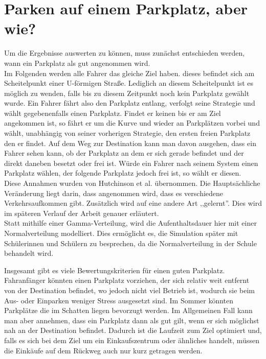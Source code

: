 \section{Parken auf einem Parkplatz, aber wie?}

Um die Ergebnisse auswerten zu können, muss zunächst entschieden werden, wann ein Parkplatz als gut angenommen wird.\\
Im Folgenden werden alle Fahrer das gleiche Ziel haben. dieses befindet sich am Scheitelpunkt einer U-förmigen Straße. Lediglich an diesem Scheitelpunkt ist es möglich zu wenden, falls bis zu diesem Zeitpunkt noch kein Parkplatz gewählt wurde. Ein Fahrer fährt also den Parkplatz entlang, verfolgt seine Strategie und wählt gegebenenfalls einen Parkplatz. Findet er keinen bis er am Ziel angekommen ist, so fährt er um die Kurve und wieder an Parkplätzen vorbei und wählt, unabhängig von seiner vorherigen Strategie, den ersten freien Parkplatz den er findet. Auf dem Weg zur Destination kann man davon ausgehen, dass ein Fahrer sehen kann, ob der Parkplatz an dem er sich gerade befindet und der direkt daneben besetzt oder frei ist. Würde ein Fahrer nach seinem System einen Parkplatz wählen, der folgende Parkplatz jedoch frei ist, so wählt er diesen.\\
Diese Annahmen wurden von Hutchinson et al. übernommen. Die Hauptsächliche Veränderung liegt darin, dass angenommen wird, dass es verschiedene Verkehrsaufkommen gibt. Zusätzlich wird auf eine andere Art ,,gelernt''. Dies wird im späteren Verlauf der Arbeit genauer erläutert.\\
Statt mithilfe einer Gamma-Verteilung, wird die Aufenthaltsdauer hier mit einer Normalverteilung modelliert. Dies ermöglicht es, die Simulation später mit Schülerinnen und Schülern zu besprechen, da die Normalverteilung in der Schule behandelt wird.

Insgesamt gibt es viele Bewertungskriterien für einen guten Parkplatz. Fahranfänger könnten einen Parkplatz vorziehen, der sich relativ weit entfernt von der Destination befindet, wo jedoch nicht viel Betrieb ist, wodurch sie beim Aus- oder Einparken weniger Stress ausgesetzt sind. Im Sommer könnten Parkplätze die im Schatten liegen bevorzugt werden. Im Allgemeinen Fall kann man aber annehmen, dass ein Parkplatz dann als gut gilt, wenn er sich möglichst nah an der Destination befindet. Dadurch ist die Laufzeit zum Ziel optimiert und, falls es sich bei dem Ziel um ein Einkaufszentrum oder ähnliches handelt, müssen die Einkäufe auf dem Rückweg auch nur kurz getragen werden.

